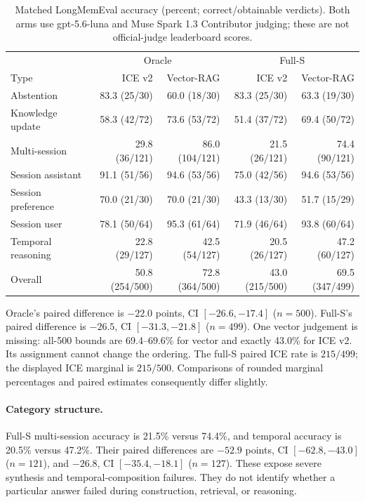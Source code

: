 \documentclass[11pt,a4paper]{article}
\begin{document}
\begin{table}[htbp]
\centering\small
\caption{Matched LongMemEval accuracy (percent; correct/obtainable verdicts). Both arms use gpt-5.6-luna and Muse Spark 1.3 Contributor judging; these are not official-judge leaderboard scores.}
\label{tab:lme-oracle}
\begin{tabular}{@{}lrrrr@{}}\toprule
 & \multicolumn{2}{c}{Oracle} & \multicolumn{2}{c}{Full-S}\\
Type & ICE v2 & Vector-RAG & ICE v2 & Vector-RAG\\\midrule
Abstention & 83.3 (25/30) & 60.0 (18/30) & 83.3 (25/30) & 63.3 (19/30)\\
Knowledge update & 58.3 (42/72) & 73.6 (53/72) & 51.4 (37/72) & 69.4 (50/72)\\
Multi-session & 29.8 (36/121) & 86.0 (104/121) & 21.5 (26/121) & 74.4 (90/121)\\
Session assistant & 91.1 (51/56) & 94.6 (53/56) & 75.0 (42/56) & 94.6 (53/56)\\
Session preference & 70.0 (21/30) & 70.0 (21/30) & 43.3 (13/30) & 51.7 (15/29)\\
Session user & 78.1 (50/64) & 95.3 (61/64) & 71.9 (46/64) & 93.8 (60/64)\\
Temporal reasoning & 22.8 (29/127) & 42.5 (54/127) & 20.5 (26/127) & 47.2 (60/127)\\
Overall & 50.8 (254/500) & 72.8 (364/500) & 43.0 (215/500) & 69.5 (347/499)\\
\bottomrule\end{tabular}
\end{table}
Oracle's paired difference is $-22.0$ points, CI $[-26.6,-17.4]$ ($n=500$). Full-S's paired difference is $-26.5$, CI $[-31.3,-21.8]$ ($n=499$). One vector judgement is missing: all-500 bounds are 69.4--69.6\% for vector and exactly 43.0\% for ICE v2. Its assignment cannot change the ordering. The full-S paired ICE rate is $215/499$; the displayed ICE marginal is $215/500$. Comparisons of rounded marginal percentages and paired estimates consequently differ slightly.

\paragraph{Category structure.}
Full-S multi-session accuracy is 21.5\% versus 74.4\%, and temporal accuracy is 20.5\% versus 47.2\%. Their paired differences are $-52.9$ points, CI $[-62.8,-43.0]$ ($n=121$), and $-26.8$, CI $[-35.4,-18.1]$ ($n=127$). These expose severe synthesis and temporal-composition failures. They do not identify whether a particular answer failed during construction, retrieval, or reasoning.
\end{document}
